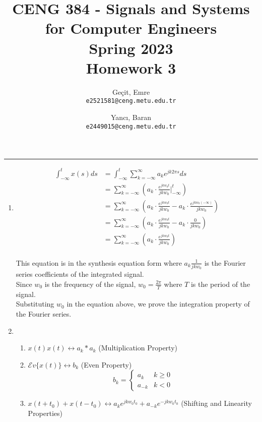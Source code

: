 \documentclass[10pt,a4paper, margin=1in]{article}
\author{
  Geçit, Emre\\
  \texttt{e2521581@ceng.metu.edu.tr}
  \and
  Yancı, Baran\\
  \texttt{e2449015@ceng.metu.edu.tr}
}
\title{CENG 384 - Signals and Systems for Computer Engineers \\
Spring 2023 \\
Homework 3}
\begin{document}
\maketitle



\noindent\rule{19cm}{1.2pt}

\begin{enumerate}

\item \begin{align*}
    \int_{-\infty}^t x(s) ds &= \int_{-\infty}^{t} \sum_{k=-\infty}^{\infty} a_k e^{jk2\pi  s} ds\\
    &= \sum_{k=-\infty}^{\infty} (a_k \cdot \frac{e^{jkw_0t}}{jkw_0} \Big|_{-\infty}^{t})\\
    &= \sum_{k=-\infty}^{\infty} (a_k \cdot \frac{e^{jkw_0t}}{jkw_0} - a_k \cdot \frac{e^{jkw_0 (-\infty)}}{jkw_0})\\
    &= \sum_{k=-\infty}^{\infty} (a_k \cdot \frac{e^{jkw_0t}}{jkw_0} - a_k \cdot \frac{0}{jkw_0})\\
    &= \sum_{k=-\infty}^{\infty} (a_k \cdot \frac{e^{jkw_0t}}{jkw_0})\\
\end{align*}

This equation is in the synthesis equation form where $a_k \frac{1}{jkw_0}$ is the Fourier series coefficients of the integrated signal.\\

Since $w_0$ is the frequency of the signal, $w_0 = \frac{2\pi}{T}$ where $T$ is the period of the signal.\\

Substituting $w_0$ in the equation above, we prove the integration property of the Fourier series.\\

\item %
	\begin{enumerate}
    \item $x(t)x(t) \leftrightarrow a_k \ast a_k$ (Multiplication Property)
    \item $\mathcal{E}v\{x(t)\} \leftrightarrow b_k$ (Even Property) \[b_k= \begin{cases}
        a_k & k \geq 0 \\
        a_{-k} & k < 0
    \end{cases} \]
    \item $x(t+t_0) + x(t-t_0) \leftrightarrow a_k e^{jkw_0t_0} + a_{-k} e^{-jkw_0t_0} $ (Shifting and Linearity Properties)
    \end{enumerate}


\end{enumerate}
\end{document}
